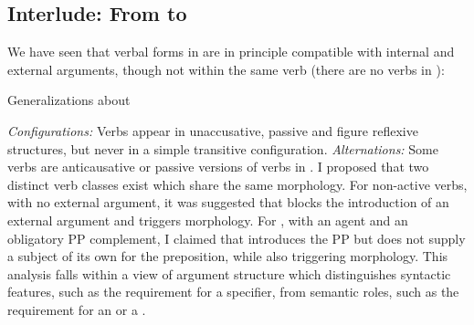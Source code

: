 \begin{exe}
\begin{xlist}
\begin{xlist}
\begin{exe}
\begin{xlist}
\begin{xlist}
\begin{exe}
\begin{xlist}
\begin{xlist}
\begin{exe}
\begin{exe}
\begin{xlist}
\begin{exe}
\begin{exe}
\begin{xlist}
\begin{exe}
\begin{exe}
\begin{exe}
\begin{exe}
\begin{exe}
\begin{xlist}
\begin{exe}
\begin{xlist}
\begin{exe}
\begin{exe}
\begin{xlist}
\begin{exe}
\begin{xlist}
\begin{exe}
\begin{xlist}
\begin{exe}
\begin{exe}
\begin{exe}
\begin{xlist}
\begin{exe}
\begin{exe}
\begin{exe}
\begin{xlist}
\begin{exe}
\begin{xlist}
\begin{exe}
\begin{xlist}
\begin{exe}
\begin{xlist}
\begin{exe}
\begin{exe}
\begin{exe}
\begin{exe}
\begin{xlist}
\begin{exe}
\begin{xlist}
\begin{exe}
\begin{xlist}
\begin{exe}
\begin{xlist}
\begin{exe}
\begin{xlist}
\begin{exe}
\begin{xlist}
\begin{exe}
\begin{exe}
\begin{exe}
\begin{exe}
\begin{xlist}
\begin{exe}
\begin{xlist}
\begin{exe}
\begin{xlist}
\begin{exe}
\section{Interlude: From {\tnif} to {\thit}} \label{vz:interim}
We have seen that verbal forms in {\tnif} are in principle compatible with internal and external arguments, though not within the same verb (there are no  verbs in {\tnif}):

 \begin{exe}
 \ex  \label{ex:gen-tnif2}Generalizations about {\tnif}
 \begin{xlist} 
 	\ex  \textit{Configurations:} Verbs appear in unaccusative, passive and figure reflexive structures, but never in a simple transitive configuration. 
 	\ex  \textit{Alternations:} Some verbs are anticausative or passive versions of verbs in {\tkal}. 
 \z
\z 
I proposed that two distinct verb classes exist which share the same morphology. For non-active verbs, with no external argument, it was suggested that {\vz} blocks the introduction of an external argument and triggers {\tnif} morphology. For , with an agent and an obligatory PP complement, I claimed that {\pz} introduces the PP but does not supply a subject of its own for the preposition, while also triggering {\tnif} morphology. This analysis falls within a view of argument structure which distinguishes syntactic features, such as the requirement for a specifier, from semantic roles, such as the requirement for an  or a .


\end{xlist}
\end{exe}
\end{exe}
\end{xlist}
\end{exe}
\end{xlist}
\end{exe}
\end{xlist}
\end{exe}
\end{exe}
\end{exe}
\end{exe}
\end{xlist}
\end{exe}
\end{xlist}
\end{exe}
\end{xlist}
\end{exe}
\end{xlist}
\end{exe}
\end{xlist}
\end{exe}
\end{xlist}
\end{exe}
\end{exe}
\end{exe}
\end{exe}
\end{xlist}
\end{exe}
\end{xlist}
\end{exe}
\end{xlist}
\end{exe}
\end{xlist}
\end{exe}
\end{exe}
\end{exe}
\end{xlist}
\end{exe}
\end{exe}
\end{exe}
\end{xlist}
\end{exe}
\end{xlist}
\end{exe}
\end{xlist}
\end{exe}
\end{exe}
\end{xlist}
\end{exe}
\end{xlist}
\end{exe}
\end{exe}
\end{exe}
\end{exe}
\end{exe}
\end{xlist}
\end{exe}
\end{exe}
\end{xlist}
\end{exe}
\end{exe}
\end{xlist}
\end{xlist}
\end{exe}
\end{xlist}
\end{xlist}
\end{exe}
\end{xlist}
\end{xlist}
\end{exe}
